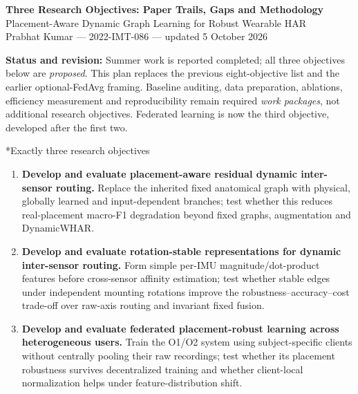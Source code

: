 \documentclass[10pt]{article}
\begin{document}
\fi

\makeatletter
\renewcommand{\section}{\@startsection{section}{1}{0pt}{8pt}{4pt}{\normalfont\large\bfseries}}
\renewcommand{\subsection}{\@startsection{subsection}{2}{0pt}{6pt}{3pt}{\normalfont\normalsize\bfseries}}
\makeatother
{}

\begin{center}
{\large\bfseries Three Research Objectives: Paper Trails, Gaps and Methodology}\\[3pt]
{\small Placement-Aware Dynamic Graph Learning for Robust Wearable HAR}\\[3pt]
{\small Prabhat Kumar --- 2022-IMT-086 --- updated 5 October 2026}
\end{center}

\textbf{Status and revision:} Summer work is reported completed; all three objectives below are \emph{proposed}. This plan replaces the previous eight-objective list and the earlier optional-FedAvg framing. Baseline auditing, data preparation, ablations, efficiency measurement and reproducibility remain required \emph{work packages}, not additional research objectives. Federated learning is now the third objective, developed after the first two.

\section*{Exactly three research objectives}
\begin{enumerate}[label=\textbf{O\arabic*.}]
\item \textbf{Develop and evaluate placement-aware residual dynamic inter-sensor routing.} Replace the inherited fixed anatomical graph with physical, globally learned and input-dependent branches; test whether this reduces real-placement macro-F1 degradation beyond fixed graphs, augmentation and DynamicWHAR.
\item \textbf{Develop and evaluate rotation-stable representations for dynamic inter-sensor routing.} Form simple per-IMU magnitude/dot-product features before cross-sensor affinity estimation; test whether stable edges under independent mounting rotations improve the robustness--accuracy--cost trade-off over raw-axis routing and invariant fixed fusion.
\item \textbf{Develop and evaluate federated placement-robust learning across heterogeneous users.} Train the O1/O2 system using subject-specific clients without centrally pooling their raw recordings; test whether its placement robustness survives decentralized training and whether client-local normalization helps under feature-distribution shift.
\end{enumerate}
\end{document}
